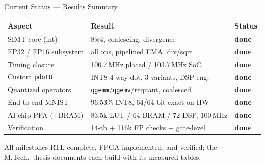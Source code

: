 \documentclass[aspectratio=169,11pt]{beamer}
\begin{document}
\begin{frame}{Current Status --- Results Summary}
  \begin{center}\small
  \begin{tabular}{@{}lll@{}}
    \toprule
    Aspect & Result & Status \\
    \midrule
    SIMT core (int)        & 8$\times$4, coalescing, divergence   & \color{simtixgreen}\textbf{done} \\
    FP32 / FP16 subsystem  & all ops, pipelined FMA, div/sqrt     & \color{simtixgreen}\textbf{done} \\
    Timing closure         & 100.7\,MHz placed / 103.7\,MHz SoC   & \color{simtixgreen}\textbf{done} \\
    Custom \texttt{pdot8}  & INT8 4-way dot, 3 variants, DSP eng. & \color{simtixgreen}\textbf{done} \\
    Quantized operators    & \texttt{qgemm}/\texttt{qgemv}/requant, coalesced & \color{simtixgreen}\textbf{done} \\
    End-to-end MNIST       & 96.53\% INT8, 64/64 bit-exact on HW  & \color{simtixgreen}\textbf{done} \\
    AI chip PPA (+BRAM)    & 83.5k LUT / 64 BRAM / 72 DSP, 100\,MHz & \color{simtixgreen}\textbf{done} \\
    Verification           & 14-tb + 116k FP checks + gate-level  & \color{simtixgreen}\textbf{done} \\
    \bottomrule
  \end{tabular}
  \end{center}
  \vspace{0.4em}
  {\footnotesize All milestones RTL-complete, FPGA-implemented, and verified; the M.Tech.\ thesis
  documents each build with its measured tables.}
\end{frame}
\end{document}
